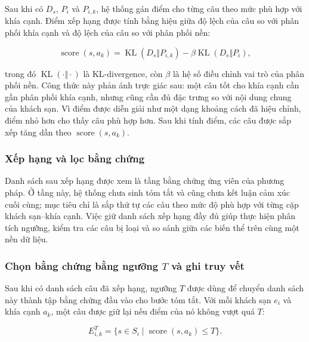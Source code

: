 Sau khi có \(D_s\), \(P_i\) và \(P_{i,k}\), hệ thống gán điểm cho từng câu theo mức phù hợp với khía cạnh. Điểm xếp hạng được tính bằng hiệu giữa độ lệch của câu so với phân phối khía cạnh và độ lệch của câu so với phân phối nền:

\begin{equation}
\operatorname{score}(s,a_k)
=
\operatorname{KL}(D_s\Vert P_{i,k})
-
\beta\operatorname{KL}(D_s\Vert P_i),
\label{eq:method2-ranking-score}
\end{equation}

trong đó \(\operatorname{KL}(\cdot\Vert\cdot)\) là KL-divergence, còn \(\beta\) là hệ số điều chỉnh vai trò của phân phối nền. Công thức này phản ánh trực giác sau: một câu tốt cho khía cạnh cần gần phân phối khía cạnh, nhưng cũng cần đủ đặc trưng so với nội dung chung của khách sạn. Vì điểm được diễn giải như một dạng khoảng cách đã hiệu chỉnh, điểm nhỏ hơn cho thấy câu phù hợp hơn. Sau khi tính điểm, các câu được sắp xếp tăng dần theo \(\operatorname{score}(s,a_k)\).

\subsubsection{Xếp hạng và lọc bằng chứng}
\label{subsubsec:method2-evidence-ranking}

Danh sách sau xếp hạng được xem là tầng bằng chứng ứng viên của phương pháp. Ở tầng này, hệ thống chưa sinh tóm tắt và cũng chưa kết luận cảm xúc cuối cùng; mục tiêu chỉ là sắp thứ tự các câu theo mức độ phù hợp với từng cặp khách sạn--khía cạnh. Việc giữ danh sách xếp hạng đầy đủ giúp thực hiện phân tích ngưỡng, kiểm tra các câu bị loại và so sánh giữa các biến thể trên cùng một nền dữ liệu.

\subsubsection{Chọn bằng chứng bằng ngưỡng $T$ và ghi truy vết}
\label{subsec:method2-threshold-provenance}

Sau khi có danh sách câu đã xếp hạng, ngưỡng \(T\) được dùng để chuyển danh sách này thành tập bằng chứng đầu vào cho bước tóm tắt. Với mỗi khách sạn \(e_i\) và khía cạnh \(a_k\), một câu được giữ lại nếu điểm của nó không vượt quá \(T\):

\begin{equation}
E_{i,k}^{T}
=
\{s\in S_i \mid \operatorname{score}(s,a_k)\leq T\}.
\label{eq:method2-threshold-evidence}
\end{equation}

